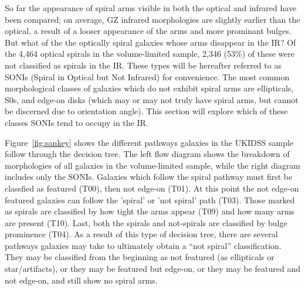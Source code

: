 So far the appearance of spiral arms visible in both the optical and infrared have been compared; on average, GZ infrared morphologies are slightly earlier than the optical, a result of a looser appearance of the arms and more prominant bulges. But what of the the optically spiral galaxies whose arms disappear in the IR? Of the 4,464 optical spirals in the volume-limited sample, 2,346 (53\%) of these were not classified as spirals in the IR. These types will be hereafter referred to as SONIs (Spiral in Optical but Not Infrared) for convenience. The most common morphological classes of galaxies which do not exhibit spiral arms are ellipticals, S0s, and edge-on disks (which may or may not truly have spiral arms, but cannot be discerned due to orientation angle). This section will explore which of these classes SONIs tend to occupy in the IR. 


Figure~\ref{fig:sankey} shows the different pathways galaxies in the UKIDSS sample follow through the decision tree. The left flow diagram shows the breakdown of morphologies of all galaxies in the volume-limited sample, while the right diagram includes only the SONIs. Galaxies which follow the spiral pathway must first be classfied as featured (T00), then not edge-on (T01). At this point the not edge-on featured galaxies can follow the 'spiral' or 'not spiral' path (T03). Those marked as spirals are classified by how tight the arms appear (T09) and how many arms are present (T10). Last, both the spirals and not-spirals are classified by bulge prominence (T04). As a result of this type of decision tree, there are several pathways galaxies may take to ultimately obtain a ``not spiral'' classification. They may be classified from the beginning as not featured (as ellipticals or star/artifacts), or they may be featured but edge-on, or they may be featured and not edge-on, and still show no spiral arms.

